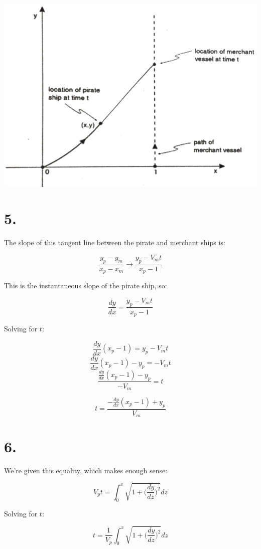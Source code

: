 \documentclass[11pt]{report}
\begin{document}
\includegraphics[width=\linewidth]{part4}

\section*{5.}

The slope of this tangent line between the pirate and merchant ships is:

$$
	\frac{y_{p} - y_{m}} {x_{p} - x_{m}}
	\rightarrow
	\frac{y_{p} - V_{m}t} {x_{p} - 1}
$$

This is the instantaneous slope of the pirate ship, so:

$$
    \frac{dy}{dx} = \frac{y_{p} - V_{m}t} {x_{p} - 1}
$$

Solving for $t$:

$$ \frac{dy}{dx}(x_p - 1) = y_p - V_mt $$
$$ \frac{dy}{dx}(x_p - 1) - y_p = -V_mt $$
$$ \frac
	{\frac{dy}{dx}(x_p - 1) - y_p}
	{-V_m}
   = t $$
   
$$ t = \frac
	{-\frac{dy}{dx}(x_p - 1) + y_p}
	{V_m}
$$



\section*{6.}

We're given this equality, which makes enough sense:

$$ V_pt = \int_0^x \sqrt{1 + \Big(\frac{dy}{dz}\Big)^2} dz $$

Solving for $t$:

$$ t = \frac{1}{V_p} \int_0^x \sqrt{1 + \Big(\frac{dy}{dz}\Big)^2} dz $$
\end{document}

